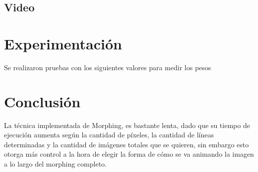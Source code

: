 \documentclass[conference]{IEEEtran}
\begin{document}
	\subsection*{Video}



\section*{Experimentación}
	Se realizaron pruebas con los siguientes valores para medir los pesos	
	
\section*{Conclusión}
	La técnica implementada de Morphing, es bastante lenta, dado que su tiempo de ejecución aumenta según la cantidad de píxeles, la cantidad de líneas determinadas y la cantidad de imágenes totales que se quieren, sin embargo esto otorga más control a la hora de elegir la forma de cómo se va animando la imagen a lo largo del morphing completo.
	
\begin{thebibliography}{99}

\end{thebibliography}
\end{document}
